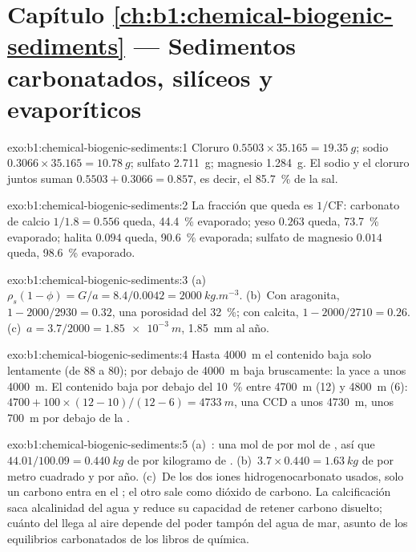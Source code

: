 \section*{Capítulo \ref{ch:b1:chemical-biogenic-sediments} --- Sedimentos carbonatados, silíceos y evaporíticos}

\begin{solution}{exo:b1:chemical-biogenic-sediments:1}
Cloruro $0.5503\times35.165 = \qty{19.35}{g}$; sodio $0.3066\times35.165 =
\qty{10.78}{g}$; sulfato \qty{2.711}{g}; magnesio \qty{1.284}{g}. El sodio y el cloruro juntos suman $0.5503 + 0.3066 = 0.857$, es decir, el \qty{85.7}{\%} de
la sal.
\end{solution}

\begin{solution}{exo:b1:chemical-biogenic-sediments:2}
La fracción que queda es $1/\mathrm{CF}$: carbonato de calcio $1/1.8 = 0.556$ queda, \qty{44.4}{\%} evaporado; yeso $0.263$ queda, \qty{73.7}{\%} evaporado;
halita $0.094$ queda, \qty{90.6}{\%} evaporada; sulfato de magnesio $0.014$ queda, \qty{98.6}{\%} evaporado.
\end{solution}

\begin{solution}{exo:b1:chemical-biogenic-sediments:3}
(a)~$\rho_s(1-\phi) = G/a = 8.4/0.0042 = \qty{2000}{kg.m^{-3}}$. (b)~Con aragonita, $1 - 2000/2930 = 0.32$, una porosidad del \qty{32}{\%}; con calcita,
$1 - 2000/2710 = 0.26$. (c)~$a = 3.7/2000 = \qty{1.85e-3}{m}$, \qty{1.85}{mm} al año.
\end{solution}

\begin{solution}{exo:b1:chemical-biogenic-sediments:4}
Hasta \qty{4000}{m} el contenido baja solo lentamente (de 88 a 80); por debajo de \qty{4000}{m} baja bruscamente: la  yace a unos \qty{4000}{m}. El contenido
baja por debajo del \qty{10}{\%} entre \qty{4700}{m} (12) y \qty{4800}{m} (6): $4700 + 100\times(12-10)/(12-6) = \qty{4733}{m}$, una CCD a unos \qty{4730}{m}, unos
\qty{700}{m} por debajo de la .
\end{solution}

\begin{solution}{exo:b1:chemical-biogenic-sediments:5}
(a)~: una mol de  por mol de , así que $44.01/100.09 = \qty{0.440}{kg}$ de  por kilogramo de
. (b)~$3.7\times0.440 = \qty{1.63}{kg}$ de  por metro cuadrado y por año. (c)~De los dos iones hidrogenocarbonato usados, solo un carbono entra en el
; el otro sale como dióxido de carbono. La calcificación saca alcalinidad del agua y reduce su capacidad de retener carbono disuelto; cuánto del  llega al aire
depende del poder tampón del agua de mar, asunto de los equilibrios carbonatados de los libros de química.
\end{solution}

